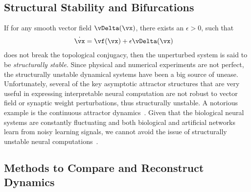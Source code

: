 \documentclass{article}
\theoremstyle{definition} \newtheorem{definition}{Definition}  \newtheorem{example}{Example}
\theoremstyle{remark} \newtheorem{remark}{Remark}
\newcounter{ct}
\begin{document}
\subsection{Structural Stability and Bifurcations}
If for any smooth vector field $\vDelta(\vx)$, there exists an $\epsilon > 0$, such that
\begin{align}\label{eq:vfp:epsilon}
\dot{\vx} &= \vf(\vx) + \epsilon\vDelta(\vx)
\end{align}
does not break the topological conjugacy, then the unperturbed system is said to be \emph{structurally stable}.
Since physical and numerical experiments are not perfect, the structurally unstable dynamical systems have been a big source of unease. %
Unfortunately, several of the key asymptotic attractor structures that are very useful in expressing interpretable neural computation are not robust to vector field or synaptic weight perturbations, thus structurally unstable.
A notorious example is the continuous attractor dynamics~\citep{Sagodi2024a}.
Given that the biological neural systems are constantly fluctuating and both biological and artificial networks learn from noisy learning signals, we cannot avoid the issue of structurally unstable neural computations~\citep{Park2023a}.

%
\subsection{Methods to Compare and Reconstruct Dynamics}\label{sec:comparison}
\end{document}
